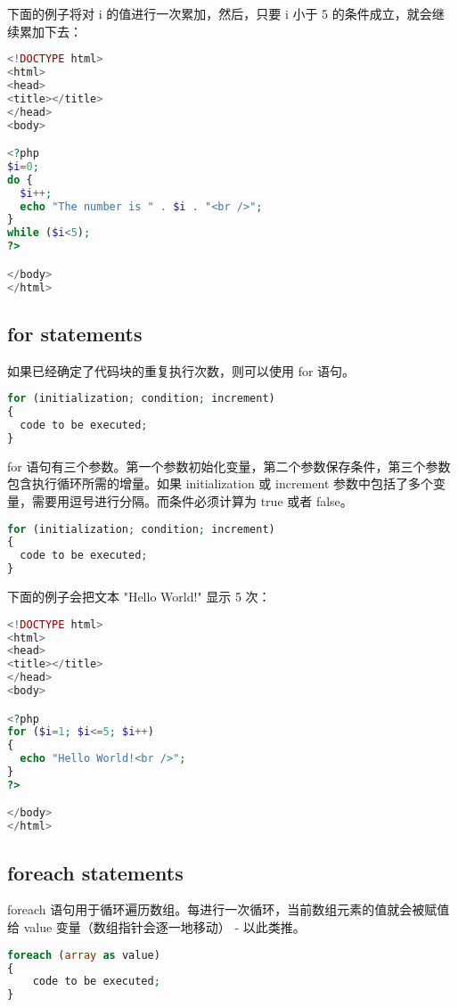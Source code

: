 下面的例子将对 i 的值进行一次累加，然后，只要 i 小于 5 的条件成立，就会继续累加下去：

\begin{lstlisting}[language=PHP]
<!DOCTYPE html>
<html>
<head>
<title></title>
</head>
<body>

<?php 
$i=0;
do {
  $i++;
  echo "The number is " . $i . "<br />";
}
while ($i<5);
?>

</body>
</html>
\end{lstlisting}

\subsection{for statements}

如果已经确定了代码块的重复执行次数，则可以使用 for 语句。

\begin{lstlisting}[language=PHP]
for (initialization; condition; increment)
{
  code to be executed;
}
\end{lstlisting}

for 语句有三个参数。第一个参数初始化变量，第二个参数保存条件，第三个参数包含执行循环所需的增量。如果 initialization 或 increment 参数中包括了多个变量，需要用逗号进行分隔。而条件必须计算为 true 或者 false。

\begin{lstlisting}[language=PHP]
for (initialization; condition; increment)
{
  code to be executed;
}
\end{lstlisting}

下面的例子会把文本 "Hello World!" 显示 5 次：

\begin{lstlisting}[language=PHP]
<!DOCTYPE html>
<html>
<head>
<title></title>
</head>
<body>

<?php
for ($i=1; $i<=5; $i++)
{
  echo "Hello World!<br />";
}
?>

</body>
</html>
\end{lstlisting}

\subsection{foreach statements}

foreach 语句用于循环遍历数组。每进行一次循环，当前数组元素的值就会被赋值给 value 变量（数组指针会逐一地移动） - 以此类推。


\begin{lstlisting}[language=PHP]
foreach (array as value)
{
    code to be executed;
}
\end{lstlisting}

